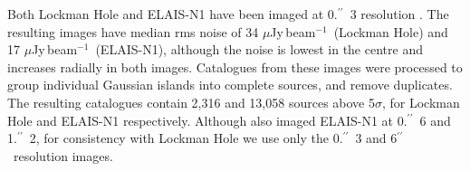 \documentclass[usenatbib,fleqn,letters]{mnras}
\newcommand{\sarc}{$^{\prime\prime}\!\!$}
\newcommand{\muJybm}{$\mu$Jy$\,$beam$^{-1}$}
\begin{document}
Both Lockman Hole and ELAIS-N1 have been imaged at 0.\sarc\ 3 resolution \citep[][respectively]{sweijen_deep_2022,de_jong_into_2024}. The resulting images have median rms noise of 34 \muJybm\ (Lockman Hole) and 17 \muJybm\ (ELAIS-N1), although the noise is lowest in the centre and increases radially in both images.  %
Catalogues from these images were processed to group individual Gaussian islands into complete sources, and remove duplicates. The resulting catalogues contain 2,316 and 13,058 sources above 5$\sigma$, for Lockman Hole and ELAIS-N1 respectively. Although \cite{de_jong_into_2024} also imaged ELAIS-N1 at 0.\sarc\ 6 and 1.\sarc\ 2, for consistency with Lockman Hole we use only the 0.\sarc\ 3 and 6\sarc\ resolution images. 

\end{document}
